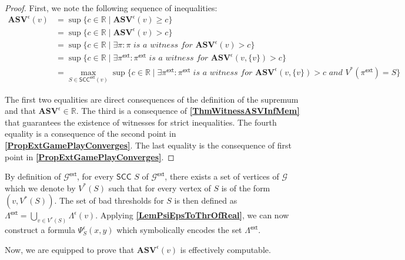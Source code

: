 \begin{proof}
First, we note the following sequence of inequalities:
\begin{equation*}
    \begin{split}
        \mathbf{ASV}^{\epsilon}(v) &= \sup \{ c \in \mathbb{R} \mid \mathbf{ASV}^{\epsilon}(v) \geqslant c \} \\
        &= \sup \{ c \in \mathbb{R} \mid \mathbf{ASV}^{\epsilon}(v) > c \} \\
        &= \sup \{ c \in \mathbb{R} \mid \exists \pi: \pi \textit{ is a witness for } \mathbf{ASV}^{\epsilon}(v) > c \} \\
        &= \sup \{ c \in \mathbb{R} \mid \exists \pi^{\mathsf{ext}}: \pi^{\mathsf{ext}} \textit{ is a witness for } \mathbf{ASV}^{\epsilon}(v, \{v\}) > c \} \\
        &= \max \limits_{S \in \mathsf{SCC}^{\mathsf{ext}}(v)} \sup \{ c \in \mathbb{R} \mid \exists \pi^{\mathsf{ext}}: \pi^{\mathsf{ext}} \textit{ is a witness for } \mathbf{ASV}^{\epsilon}(v, \{v\}) > c \textit{ and } V^{*}(\pi^{\mathsf{ext}}) = S \}
    \end{split}
\end{equation*}

The first two equalities are direct consequences of the definition of the supremum and that $\mathbf{ASV}^{\epsilon} \in \mathbb{R}$. The third is a consequence of \textbf{\cref{ThmWitnessASVInfMem}} that guarantees the existence of witnesses for strict inequalities. The fourth equality is a consequence of the second point in \textbf{\cref{PropExtGamePlayConverges}}. The last equality is the consequence of first point in \textbf{\cref{PropExtGamePlayConverges}}.
\end{proof}

By definition of $\mathcal{G}^{\mathsf{ext}}$, for every $\mathsf{SCC}$ $S$ of $\mathcal{G}^{\mathsf{ext}}$, there exists a set of vertices of $\mathcal{G}$ which we denote by $V^{*}(S)$ such that for every vertex of $S$ is of the form $(v, V^*(S))$. The set of bad thresholds for $S$ is then defined as $\Lambda^{\mathsf{ext}} = \bigcup_{v \in V^{*}(S)} \Lambda^{\epsilon}(v)$. Applying \textbf{\cref{LemPsiEpsToThrOfReal}}, we can now construct a formula $\Psi^{\epsilon}_{S}(x,y)$ which symbolically encodes the set $\Lambda^{\mathsf{ext}}$.

Now, we are equipped to prove that $\mathbf{ASV}^{\epsilon}(v)$ is effectively computable.

